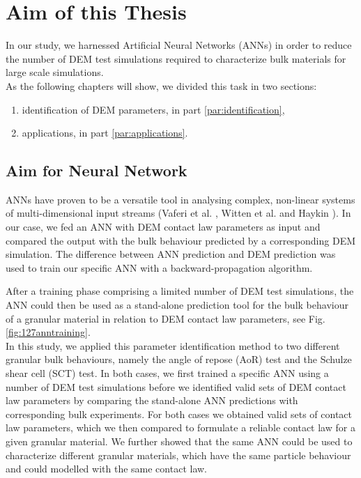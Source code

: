 
\chapter{Aim of this Thesis}
\label{cap:aim}

In our study, we harnessed Artificial Neural Networks (\acs{ANNs}) in order to
reduce the number of \acs{DEM} test simulations required
to characterize bulk materials for large scale simulations. \\
As the following chapters will show, we divided this task in two sections:
\begin{enumerate}
  \item{identification of \acs{DEM} parameters, in part
  \ref{par:identification},}
  \item{applications, in part \ref{par:applications}.}
\end{enumerate}

\section{Aim for Neural Network}
\label{sec:aimforneuralnetwork}

\acs{ANNs} have proven to be a versatile tool in analysing complex, non-linear
systems of multi-dimensional input streams (Vaferi et al. \cite{RefWorks:150}, Witten et
al. \cite{RefWorks:174} and Haykin \cite{RefWorks:158}).
In our case, we fed an \acs{ANN} with \acs{DEM} contact law parameters as input
and compared the output with the bulk behaviour 
predicted by a corresponding \acs{DEM} simulation. 
The difference between \acs{ANN} prediction and \acs{DEM} prediction was used to
train our specific \acs{ANN} with a backward-propagation algorithm. 

After a training phase comprising a limited number of \acs{DEM} test simulations,
the \acs{ANN} could then be used as a stand-alone prediction tool for the bulk behaviour of a 
granular material in relation to \acs{DEM} contact law parameters, see Fig.
\ref{fig:127anntraining}. \\
In this study, we applied this parameter identification method to two different
granular bulk behaviours, namely the angle of repose (\acs{AoR}) test and the
Schulze shear cell (\acs{SCT}) test.
In both cases, we first trained a specific \acs{ANN} using a number of \acs{DEM} test
simulations before we identified valid sets of \acs{DEM} contact law parameters by
comparing the stand-alone \acs{ANN} predictions with corresponding bulk experiments. 
For both cases we obtained valid sets of contact law parameters, 
which we then compared to formulate a reliable contact law for a given
granular material.
We further showed that the same \acs{ANN} could be used to characterize different
granular materials, which have the same particle behaviour and could modelled with the same contact
law.